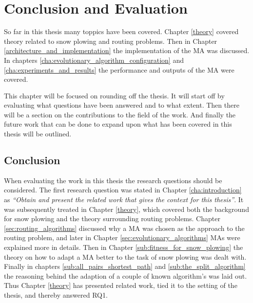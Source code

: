 \chapter{Conclusion and Evaluation}

So far in this thesis many toppics have been covered. Chapter \ref{theory} covered theory related to snow plowing and routing problems. Then in Chapter \ref{architecture_and_implementation} the implementation of the MA was discussed. In chapters \ref{cha:evolutionary_algorithm_configuration} and \ref{cha:experiments_and_results} the performance and outputs of the MA were covered.

This chapter will be focused on rounding off the thesis. It will start off by evaluating what questions have been answered and to what extent. Then there will be a section on the contributions to the field of the work. And finally the future work that can be done to expand upon what has been covered in this thesis will be outlined.

\section{Conclusion}

When evaluating the work in this thesis the research questions should be considered. The first research question was stated in Chapter \ref{cha:introduction} as \emph{\enquote{Obtain and present the related work that gives the context for this thesis}}. It was subsequently treated in Chapter \ref{theory}, which covered both the background for snow plowing and the theory surrounding routing problems. Chapter \ref{sec:routing_algorithms} discussed why a MA was chosen as the approach to the routing problem, and later in Chapter \ref{sec:evolutionary_algorithms} MAs were explained more in details. Then in Chapter \ref{sub:fitness_for_snow_plowing} the theory on how to adapt a MA better to the task of snow plowing was dealt with. Finally in chapters \ref{sub:all_pairs_shortest_path} and \ref{sub:the_split_algorithm} the reasoning behind the adaption of a couple of known algorithm's was laid out. Thus Chapter \ref{theory} has presented related work, tied it to the setting of the thesis, and thereby answered RQ1.

